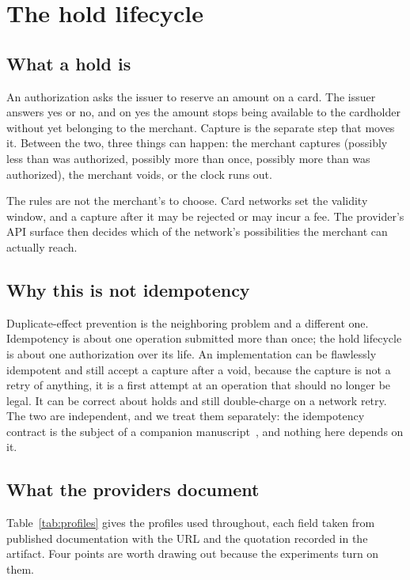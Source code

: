 \documentclass[conference]{IEEEtran}
\begin{document}
\section{The hold lifecycle}
\label{sec:background}

\subsection{What a hold is}

An authorization asks the issuer to reserve an amount on a card. The issuer
answers yes or no, and on yes the amount stops being available to the cardholder
without yet belonging to the merchant. Capture is the separate step that moves
it. Between the two, three things can happen: the merchant captures (possibly
less than was authorized, possibly more than once, possibly more than was
authorized), the merchant voids, or the clock runs out.

The rules are not the merchant's to choose. Card networks set the validity
window, and a capture after it may be rejected or may incur a fee. The
provider's API surface then decides which of the network's possibilities the
merchant can actually reach.

\subsection{Why this is not idempotency}

Duplicate-effect prevention is the neighboring problem and a different one.
Idempotency is about one operation submitted more than once; the hold lifecycle
is about one authorization over its life. An implementation can be flawlessly
idempotent and still accept a capture after a void, because the capture is not a
retry of anything, it is a first attempt at an operation that should no longer
be legal. It can be correct about holds and still double-charge on a network
retry. The two are independent, and we treat them separately: the idempotency
contract is the subject of a companion manuscript~\cite{sharma2026idempotency},
and nothing here depends on it.

\subsection{What the providers document}
\label{sec:providers}

Table~\ref{tab:profiles} gives the profiles used throughout, each field taken
from published documentation with the URL and the quotation recorded in the
artifact. Four points are worth drawing out because the experiments turn on
them.
\end{document}
